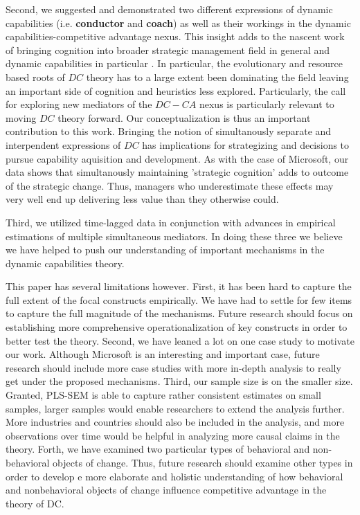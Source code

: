 \documentclass[review,fleqn]{elsarticle}\usepackage[]{graphicx}\usepackage[]{color}
\begin{document}
Second, we suggested and demonstrated two different expressions of dynamic capabilities
(i.e. {\bf conductor} and {\bf coach}) as well as their workings in the dynamic
capabilities-competitive advantage nexus. This insight adds to the nascent work of
bringing cognition into broader strategic management field in general
\citep{Gavetti2012,Gavetti2005a} and dynamic capabilities in particular
\citep{Helfat2015,Arndt2018}. In particular, the evolutionary and resource based roots of
$DC$ theory has to a large extent been dominating the field \citep{Arndt2018,Peteraf2013}
leaving an important side of cognition \citep{Verona2011} and heuristics \citep{Arndt2015}
less explored. Particularly, the call for exploring new mediators of the $DC-CA$ nexus
\citep{Schilke2018} is particularly relevant to moving $DC$ theory forward. Our
conceptualization is thus an important contribution to this work. Bringing the notion of
simultanously separate and interpendent expressions of $DC$ has implications for
strategizing and decisions to pursue capability aquisition and development. As with the
case of Microsoft, our data shows that simultanously maintaining 'strategic cognition'
adds to outcome of the strategic change. Thus, managers who underestimate these effects
may very well end up delivering less value than they otherwise could.

Third, we utilized time-lagged data in conjunction
with advances in empirical estimations of multiple simultaneous mediators. In doing these
three we believe we have helped to push our understanding of important mechanisms in the
dynamic capabilities theory.

This paper has several limitations however. First, it has been hard to capture the full
extent of the focal constructs empirically. We have had to settle for few items to capture
the full magnitude of the mechanisms. Future research should focus on establishing more
comprehensive operationalization of key constructs in order to better test the
theory. Second, we have leaned a lot on one case study to motivate our work. Although
Microsoft is an interesting and important case, future research should include more case
studies with more in-depth analysis to really get under the proposed mechanisms. Third,
our sample size is on the smaller size. Granted, PLS-SEM is able to capture rather
consistent estimates on small samples, larger samples would enable researchers to extend
the analysis further. More industries and countries should also be included in the
analysis, and more observations over time would be helpful in analyzing more causal claims
in the theory. Forth, we have examined two particular types of behavioral and
non-behavioral objects of change. Thus, future research should examine other types in
order to develop e more elaborate and holistic understanding of how behavioral and
nonbehavioral objects of change influence competitive advantage in the theory of DC.
\end{document}
